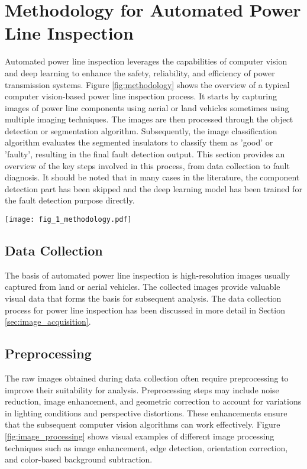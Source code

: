 \section{Methodology for Automated Power Line Inspection}\label{sec:automated}
Automated power line inspection leverages the capabilities of computer vision and deep learning to enhance the safety, reliability, and efficiency of power transmission systems. Figure \ref{fig:methodology} shows the overview of a typical computer vision-based power line inspection process. It starts by capturing images of power line components using aerial or land vehicles sometimes using multiple imaging techniques. The images are then processed through the object detection or segmentation algorithm. Subsequently, the image classification algorithm evaluates the segmented insulators to classify them as 'good' or 'faulty', resulting in the final fault detection output.  This section provides an overview of the key steps involved in this process, from data collection to fault diagnosis. It should be noted that in many cases in the literature, the component detection part has been skipped and the deep learning model has been trained for the fault detection purpose directly. 

\begin{figure*}[htb]
    \centering
    \texttt{[image: fig\_1\_methodology.pdf]}
    \caption{Block Diagram of an automated multi-modal power line inspection system.}
    \label{fig:methodology}
\end{figure*}

\subsection{Data Collection}
The basis of automated power line inspection is high-resolution images usually captured from land or aerial vehicles. The collected images provide valuable visual data that forms the basis for subsequent analysis. The data collection process for power line inspection has been discussed in more detail in Section \ref{sec:image_acquisition}.

\subsection{Preprocessing}
The raw images obtained during data collection often require preprocessing to improve their suitability for analysis. Preprocessing steps may include noise reduction, image enhancement, and geometric correction to account for variations in lighting conditions and perspective distortions. These enhancements ensure that the subsequent computer vision algorithms can work effectively. Figure \ref{fig:image_processing} shows visual examples of different image processing techniques such as image enhancement, edge detection, orientation correction, and color-based background subtraction. 

